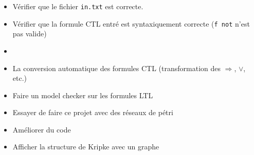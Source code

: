 \documentclass[12pt,a4paper]{report}
\begin{document}
\begin{itemize}
    \item Vérifier que le fichier \verb+in.txt+ est correcte.
    \item Vérifier que la formule CTL entré est syntaxiquement correcte (\verb+f not+ n'est pas valide)
    \item 
    \item La conversion automatique des formules CTL (transformation des $\Rightarrow$, $\lor$, etc.)
    \item Faire un model checker sur les formules LTL
    \item Essayer de faire ce projet avec des réseaux de pétri
    \item Améliorer du code
    \item Afficher la structure de Kripke avec un graphe
\end{itemize}
\end{document}
